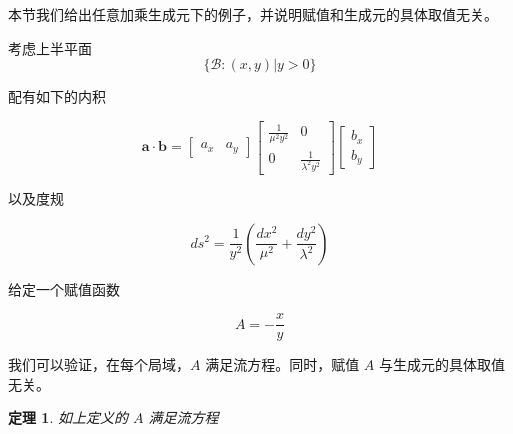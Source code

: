 \documentclass[a4paper,12pt]{article}
\numberwithin{problem}{section}
\numberwithin{definition}{section}
\numberwithin{lemma}{section}
\numberwithin{proposition}{section}
\newtheorem{theorem}{定理}
\numberwithin{theorem}{section}
\numberwithin{grammar}{section}
\numberwithin{program}{section}
\numberwithin{convention}{section}
\numberwithin{corollary}{section}
\begin{document}
本节我们给出任意加乘生成元下的例子，并说明赋值和生成元的具体取值无关。

考虑上半平面
$$
\{\mathcal{B}: (x, y) | y > 0 \}
$$

配有如下的内积

$$
\mathbf{a} \cdot \mathbf{b} = \begin{bmatrix} a_x & a_y \end{bmatrix} \begin{bmatrix} \frac{1}{\mu^2 y^2} & 0 \\ 0 & \frac{1}{\lambda^2 y^2} \end{bmatrix} \begin{bmatrix} b_x \\ b_y \end{bmatrix}
$$

以及度规

$$
ds^2 = \frac{1}{y^2}(\frac{dx^2}{\mu^2} + \frac{dy^2}{\lambda^2})
$$

给定一个赋值函数

\begin{equation}
A = - \frac{x}{y}
\end{equation}

我们可以验证，在每个局域，$A$ 满足流方程。同时，赋值 $A$ 与生成元的具体取值无关。

\begin{theorem}
如上定义的 $A$ 满足流方程
\end{theorem}
\end{document}
